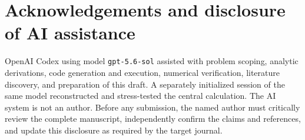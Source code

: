\documentclass[11pt,a4paper]{article}
\begin{document}
\section*{Acknowledgements and disclosure of AI assistance}

OpenAI Codex using model \texttt{gpt-5.6-sol} assisted with problem scoping, analytic
derivations, code generation and execution, numerical verification, literature
discovery, and preparation of this draft. A separately initialized session of the same
model reconstructed and stress-tested the central calculation. The AI system is not an
author. Before any submission, the named author must critically review the complete
manuscript, independently confirm the claims and references, and update this disclosure
as required by the target journal.



\end{document}
